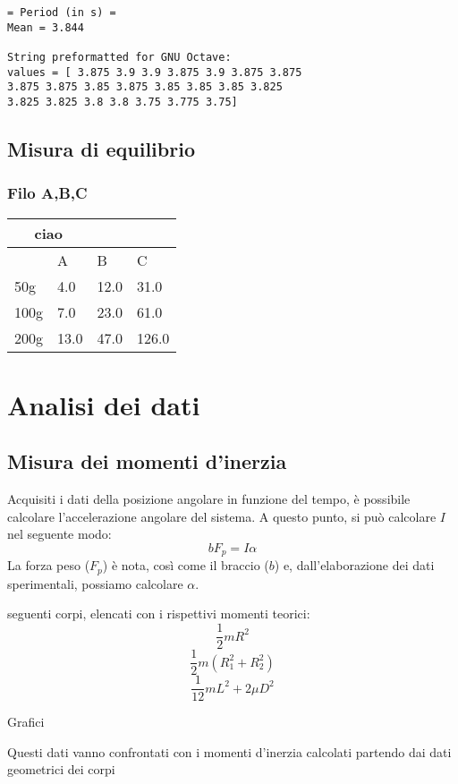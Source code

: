 \documentclass[a4paper,10pt]{report}
\begin{document}
\begin{verbatim}
= Period (in s) =
Mean = 3.844

String preformatted for GNU Octave:
values = [ 3.875 3.9 3.9 3.875 3.9 3.875 3.875
3.875 3.875 3.85 3.875 3.85 3.85 3.85 3.825
3.825 3.825 3.8 3.8 3.75 3.775 3.75]
\end{verbatim}

\subsection{ Misura di equilibrio}


\subsubsection{Filo A,B,C}
\begin{tabular}{l|l|l|l}

\multicolumn{2}{|c|}{ciao}\\

\midrule
& A & B & C \\
50g & 4.0 & 12.0 & 31.0 \\
100g & 7.0 & 23.0 & 61.0 \\
200g & 13.0 & 47.0 & 126.0 \\
\midrule


\end{tabular}

\section{Analisi dei dati}

\subsection{Misura dei momenti d'inerzia}

Acquisiti i dati della posizione angolare in funzione del tempo, è possibile calcolare l'accelerazione angolare del sistema. A questo punto, si può calcolare $I$ nel seguente modo:
$$ bF_p = I\alpha $$
La forza peso ($F_p$) è nota, così come il braccio ($b$) e, dall'elaborazione dei dati sperimentali, possiamo calcolare $\alpha$.

seguenti corpi, elencati con i rispettivi momenti teorici:
$$ \frac{1}{2} m R^2 $$
$$ \frac{1}{2} m (R^2_1 + R^2_2) $$
$$ \frac{1}{12} m L^2 + 2 \mu D^2  $$

Grafici


Questi dati vanno confrontati con i momenti d'inerzia calcolati partendo dai dati geometrici dei corpi
\end{document}
